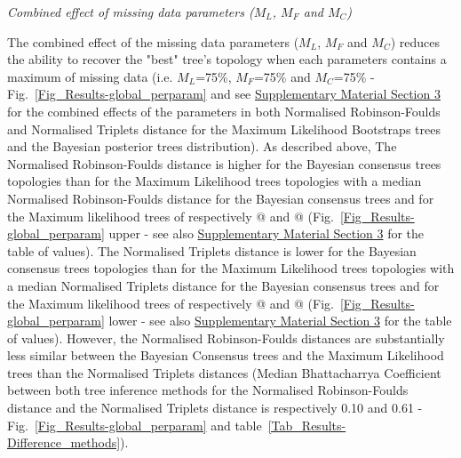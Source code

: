 \documentclass[12pt,letterpaper]{article}
\renewcommand{\subsection}[1]{%
\bigskip
\begin{center}
\begin{large}
\normalfont\itshape #1
\end{large}
\end{center}}
\begin{document}
\subsection{Combined effect of missing data parameters ($M_{L}$, $M_{F}$ and $M_{C}$)} 
The combined effect of the missing data parameters ($M_{L}$, $M_{F}$ and $M_{C}$) reduces the ability to recover the "best" tree's topology when each parameters contains a maximum of missing data (i.e. $M_{L}$=75\%, $M_{F}$=75\% and $M_{C}$=75\% - Fig.~\ref{Fig_Results-global_perparam} and see \hyperref[SupplementaryMaterial]{Supplementary Material Section 3} for the combined effects of the parameters in both Normalised Robinson-Foulds and Normalised Triplets distance for the Maximum Likelihood Bootstraps trees and the Bayesian posterior trees distribution).
As described above, The Normalised Robinson-Foulds distance is higher for the Bayesian consensus trees topologies than for the Maximum Likelihood trees topologies with a median Normalised Robinson-Foulds distance for the Bayesian consensus trees and for the Maximum likelihood trees of respectively @ and @ %
(Fig.~\ref{Fig_Results-global_perparam} upper - see also \hyperref[SupplementaryMaterial]{Supplementary Material Section 3} for the table of values).
The Normalised Triplets distance is lower for the Bayesian consensus trees topologies than for the Maximum Likelihood trees topologies with a median Normalised Triplets distance for the Bayesian consensus trees and for the Maximum likelihood trees of respectively @ and @ %
(Fig.~\ref{Fig_Results-global_perparam} lower - see also \hyperref[SupplementaryMaterial]{Supplementary Material Section 3} for the table of values).
However, the Normalised Robinson-Foulds distances are substantially less similar between the Bayesian Consensus trees and the Maximum Likelihood trees than the Normalised Triplets distances (Median Bhattacharrya Coefficient between both tree inference methods for the Normalised Robinson-Foulds distance and the Normalised Triplets distance is respectively 0.10 and 0.61 - Fig.~\ref{Fig_Results-global_perparam} and table~\ref{Tab_Results-Difference_methods}).
\end{document}
